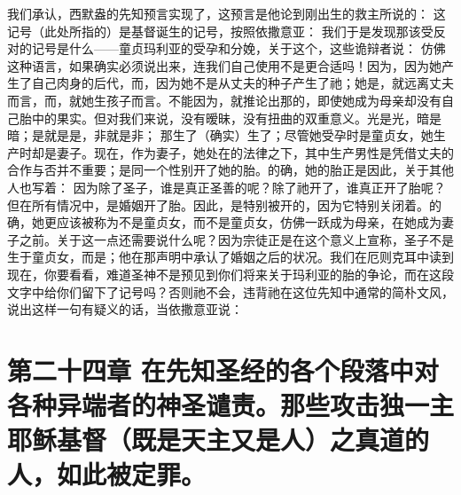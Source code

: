 我们承认，西默盎的先知预言实现了，这预言是他论到刚出生的救主所说的：  这记号（此处所指的）是基督诞生的记号，按照依撒意亚：  我们于是发现那该受反对的记号是什么——童贞玛利亚的受孕和分娩，关于这个，这些诡辩者说： 仿佛这种语言，如果确实必须说出来，连我们自己使用不是更合适吗！因为，因为她产生了自己肉身的后代，而，因为她不是从丈夫的种子产生了祂；她是，就远离丈夫而言，而，就她生孩子而言。不能因为，就推论出那的，即使她成为母亲却没有自己胎中的果实。但对我们来说，没有暧昧，没有扭曲的双重意义。光是光，暗是暗；是就是是，非就是非；  那生了（确实）生了；尽管她受孕时是童贞女，她生产时却是妻子。现在，作为妻子，她处在的法律之下，其中生产男性是凭借丈夫的合作与否并不重要；是同一个性别开了她的胎。的确，她的胎正是因此，关于其他人也写着： 因为除了圣子，谁是真正圣善的呢？除了祂开了，谁真正开了胎呢？但在所有情况中，是婚姻开了胎。因此，是特别被开的，因为它特别关闭着。的确，她更应该被称为不是童贞女，而不是童贞女，仿佛一跃成为母亲，在她成为妻子之前。关于这一点还需要说什么呢？因为宗徒正是在这个意义上宣称，圣子不是生于童贞女，而是；他在那声明中承认了婚姻之后的状况。我们在厄则克耳中读到 现在，你要看看，难道圣神不是预见到你们将来关于玛利亚的胎的争论，而在这段文字中给你们留下了记号吗？否则祂不会，违背祂在这位先知中通常的简朴文风，说出这样一句有疑义的话，当依撒意亚说： \par


\section{第二十四章 在先知圣经的各个段落中对各种异端者的神圣谴责。那些攻击独一主耶稣基督（既是天主又是人）之真道的人，如此被定罪。}

